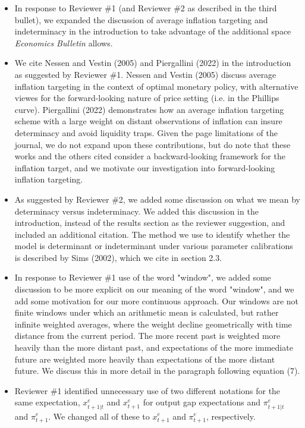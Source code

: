 \documentclass[english,authoryear,12pt]{elsarticle}
\begin{document}
\begin{itemize}
	\item In response to Reviewer \#1 (and Reviewer \#2 as described in the third bullet), we expanded the discussion of average inflation targeting and indeterminacy in the introduction to take advantage of the additional space \textit{Economics Bulletin} allows.  
	\item We cite Nessen and Vestin (2005) and Piergallini (2022) in the introduction as suggested by Reviewer \#1. Nessen and Vestin (2005)  discuss average inflation targeting in the context of optimal monetary policy, with alternative viewes for the forward-looking nature of price setting (i.e. in the Phillips curve). Piergallini (2022) demonstrates how an average inflation targeting scheme with a large weight on distant observations of inflation can insure determinacy and avoid liquidity traps. Given the page limitations of the journal, we do not expand upon these contributions, but do note that these works and the others cited consider a backward-looking framework for the inflation target, and we motivate our investigation into forward-looking inflation targeting.
	\item As suggested by Reviewer \#2, we added some discussion on what we mean by determinacy versus indeterminacy. We added this discussion in the introduction, instead of the results section as the reviewer suggestion, and included an additional citation. The method we use to identify whether the model is determinant or indeterminant under various parameter calibrations is described by Sims (2002), which we cite in section 2.3. 
	\item In response to Reviewer \#1 use of the word "window", we added some discussion to be more explicit on our meaning of the word "window", and we add some motivation for our more continuous approach. Our windows are not finite windows under which an arithmetic mean is calculated, but rather infinite weighted averages, where the weight decline geometrically with time distance from the current period. The more recent past is weighted more heavily than the more distant past, and expectations of the more immediate future are weighted more heavily than expectations of the more distant future. We discuss this in more detail in the paragraph following equation (7). 
	\item Reviewer \#1 identified unnecessary use of two different notations for the same expectation, $x^e_{t+1|t}$ and $x^e_{t+1}$ for output gap expectations and $\pi^e_{t+1|t}$ and $\pi^e_{t+1}$. We changed all of these to $x^e_{t+1}$ and $\pi^e_{t+1}$, respectively.

\end{itemize}
\end{document}
